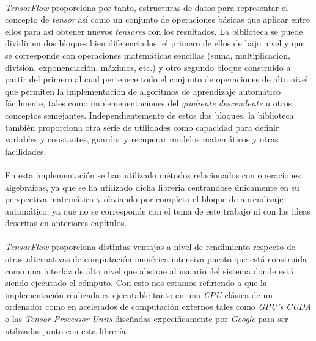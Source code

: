 \documentclass{subfiles}
\begin{document}
          \paragraph{}
          \emph{TensorFlow} proporciona por tanto, estructuras de datos para representar el concepto de \emph{tensor} así como un conjunto de operaciones básicas que aplicar entre ellos para así obtener nuevos \emph{tensores} con los resultados. La biblioteca se puede dividir en dos bloques bien diferenciados: el primero de ellos de bajo nivel y que se corresponde con operaciones matemáticas sencillas (suma, multiplicacion, division, exponenciación, máximos, etc.) y otro segundo bloque construido a partir del primero al cual pertenece todo el conjunto de operaciones de alto nivel que permiten la implementación de algoritmos de aprendizaje automático fácilmente, tales como implemenentaciones del \emph{gradiente descendente} u otros conceptos semejantes. Independientemente de estos dos bloques, la biblioteca también proporciona otra serie de utilidades como capacidad para definir variables y constantes, guardar y recuperar modelos matemáticos y otras facilidades.

          \paragraph{}
          En esta implementación se han utilizado métodos relacionados con operaciones algebraicas, ya que se ha utilizado dicha libreria centrandose únicamente en su perspectiva matemática y obviando por completo el bloque de aprendizaje automático, ya que no se corresponde con el tema de este trabajo ni con las ideas descritas en anteriores capítulos.

          \paragraph{}
          \emph{TensorFlow} proporciona distintas ventajas a nivel de rendimiento respecto de otras alternativas de computación numérica intensiva puesto que está construida como una interfaz de alto nivel que abstrae al usuario del sistema donde está siendo ejecutado el cómputo. Con esto nos estamos refiriendo a que la implementación realizada es ejecutable tanto en una \emph{CPU} clásica de un ordenador como en acelerados de computación externos tales como \emph{GPU's} \emph{CUDA} o las \emph{Tensor Processor Units} \cite{jouppi2017datacenter} diseñadas expecificamente por \emph{Google} para ser utilizadas junto con esta librería.
\end{document}

